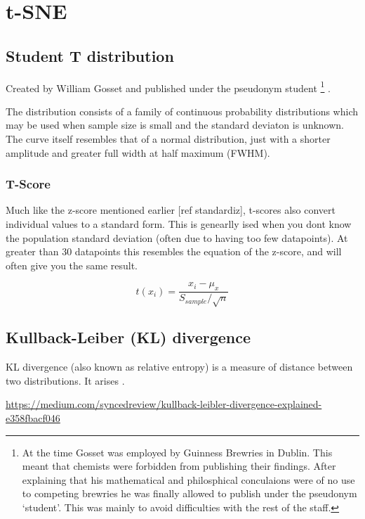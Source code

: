 \section {t-SNE} \label{appendix:tsne}

\subsection{Student T distribution}

Created by William Gosset and published under the pseudonym student \footnote{ At the time Gosset was employed by Guinness Brewries in Dublin. This meant that chemists were forbidden from publishing their findings. After explaining that his mathematical and philosphical conculaions were of no use to competing brewries he was finally allowed to publish under the pseudonym `student'. This was mainly to avoid difficulties with the rest of the staff.} \cite{student}.

The distribution consists of a family of continuous probability distributions which may be used when sample size is small and the standard deviaton is unknown. The curve itself resembles that of a normal distribution, just with a shorter amplitude and greater full width at half maximum (FWHM).


\subsubsection{T-Score}
Much like the z-score mentioned earlier [ref standardiz], t-scores also convert individual values to a standard form. This is genearlly ised when you dont know the population standard deviation (often due to having too few datapoints). At greater than 30 datapoints this resembles the equation of the z-score, and will often give you the same result.


\begin{equation}
    t(x_i) = \frac{x_i - \mu_x}{S_{sample}/\sqrt{n} }
    \label{eqn:t}
\end{equation}

\subsection{Kullback-Leiber (KL) divergence}\label{appendix:kl}
KL divergence (also known as relative entropy) is a measure of distance between two distributions. It arises
\cite{kullback}.

\url{https://medium.com/syncedreview/kullback-leibler-divergence-explained-e358fbacf046}



